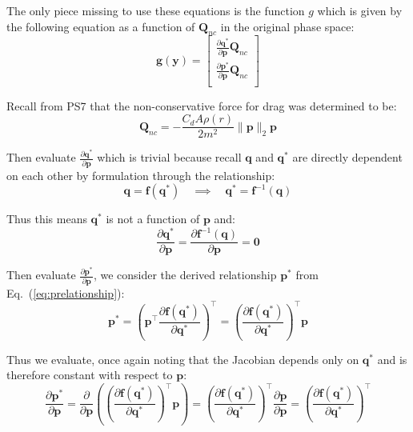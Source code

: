 \documentclass[titlepage]{article}
\begin{document}
The only piece missing to use these equations is the function $g$ which is given by the following equation as a function of $\boldsymbol{Q}_{nc}$ in the original phase space:
\begin{equation}
	\boldsymbol{g}(\boldsymbol{y})=
	\begin{bmatrix}
		\frac{\partial\boldsymbol{q}^*}{\partial\boldsymbol{p}}\boldsymbol{Q}_{nc} \\
		\frac{\partial\boldsymbol{p}^*}{\partial\boldsymbol{p}}\boldsymbol{Q}_{nc} \\
	\end{bmatrix}
\end{equation}

Recall from PS7 that the non-conservative force for drag was determined to be:
\begin{equation}
	\boldsymbol{Q}_{nc}=-\frac{C_dA\rho(r)}{2m^2}\|\boldsymbol{p}\|_2\boldsymbol{p}
\end{equation}

Then evaluate $\frac{\partial\boldsymbol{q}^*}{\partial\boldsymbol{p}}$ which is trivial because recall $\boldsymbol{q}$ and $\boldsymbol{q}^*$ are directly dependent on each other by formulation through the relationship:
\begin{equation}
	\boldsymbol{q}=\boldsymbol{f}(\boldsymbol{q}^*)\quad\implies\quad\boldsymbol{q}^*=\boldsymbol{f}^{-1}(\boldsymbol{q})
\end{equation}

Thus this means $\boldsymbol{q}^*$ is not a function of $\boldsymbol{p}$ and:
\begin{equation}
	\frac{\partial\boldsymbol{q}^*}{\partial\boldsymbol{p}}=\frac{\partial\boldsymbol{f}^{-1}(\boldsymbol{q})}{\partial\boldsymbol{p}}=\boldsymbol{0}
\end{equation}

Then evaluate $\frac{\partial\boldsymbol{p}^*}{\partial\boldsymbol{p}}$, we consider the derived relationship $\boldsymbol{p}^*$ from Eq.~(\ref{eq:prelationship}):
\begin{equation}
	\boldsymbol{p}^*=\left(\boldsymbol{p}^\top\frac{\partial\boldsymbol{f}(\boldsymbol{q}^*)}{\partial\boldsymbol{q}^*}\right)^\top=\left(\frac{\partial\boldsymbol{f}(\boldsymbol{q}^*)}{\partial\boldsymbol{q}^*}\right)^\top\boldsymbol{p}
\end{equation}

Thus we evaluate, once again noting that the Jacobian depends only on $\boldsymbol{q}^*$ and is therefore constant with respect to $\boldsymbol{p}$:
\begin{equation}
	\frac{\partial\boldsymbol{p}^*}{\partial\boldsymbol{p}}=\frac{\partial}{\partial\boldsymbol{p}}\left(\left(\frac{\partial\boldsymbol{f}(\boldsymbol{q}^*)}{\partial\boldsymbol{q}^*}\right)^\top\boldsymbol{p}\right)=\left(\frac{\partial\boldsymbol{f}(\boldsymbol{q}^*)}{\partial\boldsymbol{q}^*}\right)^\top\frac{\partial\boldsymbol{p}}{\partial\boldsymbol{p}}=\left(\frac{\partial\boldsymbol{f}(\boldsymbol{q}^*)}{\partial\boldsymbol{q}^*}\right)^\top
\end{equation}
\end{document}
